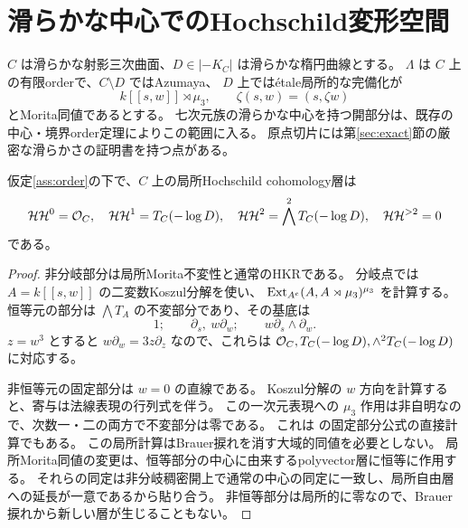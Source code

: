 \section{滑らかな中心でのHochschild変形空間}\label{sec:hh}
\begin{assumption}[本節の幾何学的適用範囲]\label{ass:order}
$C$ は滑らかな射影三次曲面、$D\in|-K_C|$ は滑らかな楕円曲線とする。
$\Lambda$ は $C$ 上の有限orderで、$C\setminus D$ ではAzumaya、
$D$ 上では\'{e}tale局所的な完備化が
\[
k[[s,w]]\rtimes\mu_3,\qquad \zeta(s,w)=(s,\zeta w)
\]
とMorita同値であるとする。
七次元族の滑らかな中心を持つ開部分は、既存の中心・境界order定理によりこの範囲に入る。
原点切片には第\ref{sec:exact}節の厳密な滑らかさの証明書を持つ点がある。
\end{assumption}

\begin{lemma}[局所Hochschild層]\label{lem:local-HH}
仮定\ref{ass:order}の下で、$C$ 上の局所Hochschild cohomology層は
\[
\mathcal{HH}^0=\mathcal O_C,\quad
\mathcal{HH}^1=T_C(-\log D),\quad
\mathcal{HH}^2=\bigwedge^2T_C(-\log D),\quad
\mathcal{HH}^{>2}=0
\]
である。
\end{lemma}
\begin{proof}
非分岐部分は局所Morita不変性と通常のHKRである。
分岐点では $A=k[[s,w]]$ の二変数Koszul分解を使い、
$\operatorname{Ext}_{A^e}(A,A\rtimes\mu_3)^{\mu_3}$ を計算する。
恒等元の部分は $\bigwedge T_A$ の不変部分であり、その基底は
\[
1;\qquad \partial_s,\ w\partial_w;\qquad w\partial_s\wedge\partial_w.
\]
$z=w^3$ とすると $w\partial_w=3z\partial_z$ なので、これらは
$\mathcal O_C,T_C(-\log D),\wedge^2T_C(-\log D)$ に対応する。

非恒等元の固定部分は $w=0$ の直線である。
Koszul分解の $w$ 方向を計算すると、寄与は法線表現の行列式を伴う。
この一次元表現への $\mu_3$ 作用は非自明なので、次数一・二の両方で不変部分は零である。
これは \cite[Theorem 1.1]{NS} の固定部分公式の直接計算でもある。
この局所計算はBrauer捩れを消す大域的同値を必要としない。
局所Morita同値の変更は、恒等部分の中心に由来するpolyvector層に恒等に作用する。
それらの同定は非分岐稠密開上で通常の中心の同定に一致し、局所自由層への延長が一意であるから貼り合う。
非恒等部分は局所的に零なので、Brauer捩れから新しい層が生じることもない。
\end{proof}

